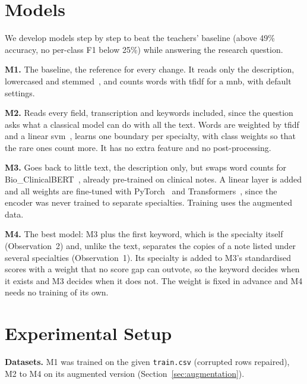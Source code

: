\documentclass[twocolumn,10pt]{article}
\begin{document}
\section{Models}
\label{sec:models}

We develop models step by step to beat the teachers' baseline (above 49\% accuracy, no per-class F1 below 25\%) while answering the research question.

\textbf{M1.} The baseline, the reference for every change. It reads only the description, lowercased and stemmed~\cite{nltk}, and counts words with \ac{tfidf} for a \ac{mnb}, with default settings.

\textbf{M2.} Reads every field, transcription and keywords included, since the question asks what a classical model can do with all the text. Words are weighted by \ac{tfidf} and a linear \ac{svm}~\cite{sklearn}, learns one boundary per specialty, with class weights so that the rare ones count more. It has no extra feature and no post-processing.

\textbf{M3.} Goes back to little text, the description only, but swaps word counts for Bio\_ClinicalBERT~\cite{bioclinicalbert}, already pre-trained on clinical notes. A linear layer is added and all weights are fine-tuned with PyTorch~\cite{pytorch} and Transformers~\cite{transformers}, since the encoder was never trained to separate specialties. Training uses the augmented data.

\textbf{M4.} The best model: M3 plus the first keyword, which is the specialty itself (Observation~2) and, unlike the text, separates the copies of a note listed under several specialties (Observation~1). Its specialty is added to M3's standardised scores with a weight that no score gap can outvote, so the keyword decides when it exists and M3 decides when it does not. The weight is fixed in advance and M4 needs no training of its own.

\section{Experimental Setup}
\label{sec:setup}

\textbf{Datasets.} M1 was trained on the given \texttt{train.csv} (corrupted rows repaired), M2 to M4 on its augmented version (Section~\ref{sec:augmentation}).
\end{document}
